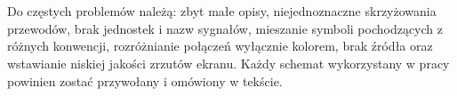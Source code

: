 \section{}

Do częstych problemów należą: zbyt małe opisy, niejednoznaczne skrzyżowania przewodów,
brak jednostek i nazw sygnałów, mieszanie symboli pochodzących z różnych konwencji,
rozróżnianie połączeń wyłącznie kolorem, brak źródła oraz wstawianie niskiej jakości
zrzutów ekranu. Każdy schemat wykorzystany w pracy powinien zostać przywołany i
omówiony w tekście.

